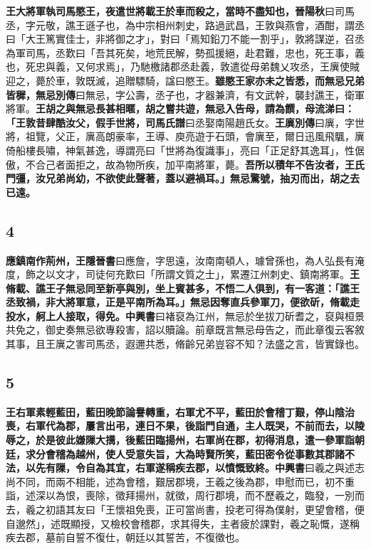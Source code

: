 \textbf{王大將軍執司馬愍王，夜遣世將載王於車而殺之，當時不盡知也，}{\footnotesize \textbf{晉陽秋}曰司馬丞，字元敬，譙王遜子也，為中宗相州刺史，路過武昌，王敦與燕會，酒酣，謂丞曰「大王篤實佳士，非將御之才」，對曰「焉知鉛刀不能一割乎」，敦將謀逆，召丞為軍司馬，丞歎曰「吾其死矣，地荒民解，勢孤援絕，赴君難，忠也，死王事，義也，死忠與義，又何求焉」，乃馳檄諸郡丞赴義，敦遣從母弟魏乂攻丞，王廙使賊迎之，薨於車，敦既滅，追贈驃騎，諡曰愍王。}\textbf{雖愍王家亦未之皆悉，而無忌兄弟皆穉，}{\footnotesize \textbf{無忌別傳}曰無忌，字公壽，丞子也，才器兼濟，有文武幹，襲封譙王，衛軍將軍。}\textbf{王胡之與無忌長甚相暱，胡之嘗共遊，無忌入告母，請為饌，母流涕曰：「王敦昔肆酷汝父，假手世將，}{\footnotesize \textbf{司馬氏譜}曰丞娶南陽趙氏女。\textbf{王廙別傳}曰廙，字世將，祖覽，父正，廙高朗豪率，王導、庾亮遊于石頭，會廙至，爾日迅風飛颿，廙倚船樓長嘯，神氣甚逸，導謂亮曰「世將為復識事」，亮曰「正足舒其逸耳」，性倨傲，不合己者面拒之，故為物所疾，加平南將軍，薨。}\textbf{吾所以積年不告汝者，王氏門彊，汝兄弟尚幼，不欲使此聲著，蓋以避禍耳。」無忌驚號，抽刃而出，胡之去已遠。}

\subsection*{4}

\textbf{應鎮南作荊州，}{\footnotesize \textbf{王隱晉書}曰應詹，字思遠，汝南南頓人，璩曾孫也，為人弘長有淹度，飾之以文才，司徒何充歎曰「所謂文質之士」，累遷江州刺史、鎮南將軍。}\textbf{王脩載、譙王子無忌同至新亭與別，坐上賓甚多，不悟二人俱到，有一客道：「譙王丞致禍，非大將軍意，正是平南所為耳。」無忌因奪直兵參軍刀，便欲斫，脩載走投水，舸上人接取，得免。}{\footnotesize \textbf{中興書}曰褚裒為江州，無忌於坐拔刀斫耆之，裒與桓景共免之，御史奏無忌欲專殺害，詔以贖論。前章既言無忌母告之，而此章復云客敘其事，且王廙之害司馬丞，遐邇共悉，脩齡兄弟豈容不知？法盛之言，皆實錄也。}

\subsection*{5}

\textbf{王右軍素輕藍田，藍田晚節論譽轉重，右軍尤不平，藍田於會稽丁艱，停山陰治喪，右軍代為郡，屢言出弔，連日不果，後詣門自通，主人既哭，不前而去，以陵辱之，於是彼此嫌隟大搆，後藍田臨揚州，右軍尚在郡，初得消息，遣一參軍詣朝廷，求分會稽為越州，使人受意失旨，大為時賢所笑，藍田密令從事數其郡諸不法，以先有隟，令自為其宜，右軍遂稱疾去郡，以憤慨致終。}{\footnotesize \textbf{中興書}曰羲之與述志尚不同，而兩不相能，述為會稽，艱居郡境，王羲之後為郡，申慰而已，初不重詣，述深以為恨，喪除，徵拜揚州，就徵，周行郡境，而不歷羲之，臨發，一別而去，羲之初語其友曰「王懷祖免喪，正可當尚書，投老可得為僕射，更望會稽，便自邈然」，述既顯授，又檢校會稽郡，求其得失，主者疲於課對，羲之恥慨，遂稱疾去郡，墓前自誓不復仕，朝廷以其誓苦，不復徵也。}

